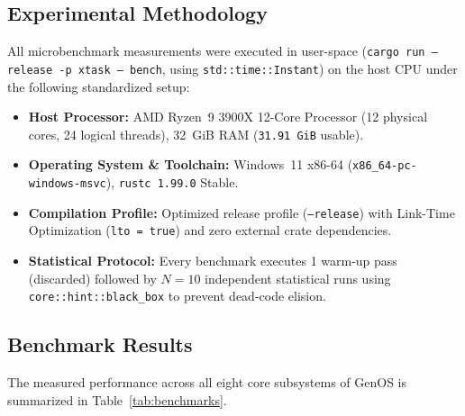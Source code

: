 \documentclass[10pt,journal,compsoc]{IEEEtran}
\theoremstyle{definition}
\begin{document}
\subsection{Experimental Methodology}
All microbenchmark measurements were executed in user-space (\texttt{cargo run --release -p xtask -- bench}, using \texttt{std::time::Instant}) on the host CPU under the following standardized setup:
\begin{itemize}
    \item \textbf{Host Processor:} AMD Ryzen~9 3900X 12-Core Processor (12 physical cores, 24 logical threads), 32~GiB RAM (\texttt{31.91~GiB} usable).
    \item \textbf{Operating System \& Toolchain:} Windows~11 x86-64 (\texttt{x86\_64-pc-windows-msvc}), \texttt{rustc 1.99.0} Stable.
    \item \textbf{Compilation Profile:} Optimized release profile (\texttt{--release}) with Link-Time Optimization (\texttt{lto = true}) and zero external crate dependencies.
    \item \textbf{Statistical Protocol:} Every benchmark executes 1 warm-up pass (discarded) followed by $N = 10$ independent statistical runs using \texttt{core::hint::\allowbreak black\_box} to prevent dead-code elision.
\end{itemize}

\subsection{Benchmark Results}
The measured performance across all eight core subsystems of GenOS is summarized in Table~\ref{tab:benchmarks}.
\end{document}
